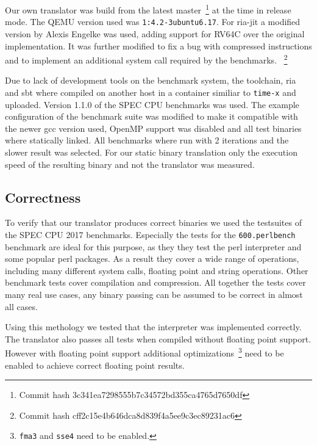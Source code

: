 \documentclass[course=eragp]{aspdoc}
\begin{document}
\par

Our own translator was build from the latest master~\footnote{Commit hash 3c341ea7298555b7c34572bd355ca4765d7650df} at the time in release mode.
The QEMU version used was \texttt{1:4.2-3ubuntu6.17}.
For ria-jit a modified version by Alexis Engelke was used, adding support for RV64C over the original implementation.
It was further modified to fix a bug with compressed instructions and to implement an additional system call required by the benchmarks.
~\footnote{Commit hash cff2c15e4b646dca8d839f4a5ee9c3ec89231ac6}

\par

Due to lack of development tools on the benchmark system, the toolchain, ria and sbt where compiled on another host in a container similiar to \texttt{time-x} and uploaded. %
Version 1.1.0 of the SPEC CPU benchmarks was used.
The example configuration of the benchmark suite was modified to make it compatible with the newer gcc version used, OpenMP support was disabled and all test binaries where statically linked.
All benchmarks where run with 2 iterations and the slower result was selected.
For our static binary translation only the execution speed of the resulting binary and not the translator was measured.

\subsection{Correctness}

To verify that our translator produces correct binaries we used the testsuites of the SPEC CPU 2017 benchmarks.
Especially the tests for the \texttt{600.perlbench} benchmark are ideal for this purpose, as they they test the perl interpreter and some popular perl packages.
As a result they cover a wide range of operations, including many different system calls, floating point and string operations.
Other benchmark tests cover compilation and compression.
All together the tests cover many real use cases, any binary passing can be assumed to be correct in almost all cases.

\par

Using this methology we tested that the interpreter was implemented correctly.
The translator also passes all tests when compiled without floating point support.
However with floating point support additional optimizations~\footnote{\texttt{fma3} and \texttt{sse4} need to be enabled.} need to be enabled to achieve correct floating point results.
\end{document}
